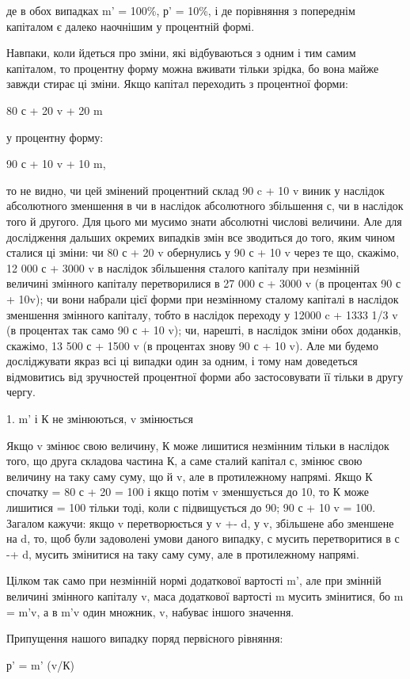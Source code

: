 де в обох випадках m' = 100\%, р' = 10\%, і де порівняння з попереднім
капіталом є далеко наочнішим у процентній формі.

Навпаки, коли йдеться про зміни, які відбуваються з одним
і тим самим капіталом, то процентну форму можна вживати
тільки зрідка, бо вона майже завжди стирає ці зміни. Якщо
капітал переходить з процентної форми:

80 с + 20 v + 20 m

у процентну форму:

90 с + 10 v + 10 m,

то не видно, чи цей змінений процентний склад 90 c + 10 v виник
у наслідок абсолютного зменшення в чи в наслідок абсолютного
збільшення с, чи в наслідок того й другого. Для цього ми мусимо
знати абсолютні числові величини. Але для дослідження
дальших окремих випадків змін все зводиться до того, яким
чином сталися ці зміни: чи 80 с + 20 v обернулись у 90 с + 10 v
через те що, скажімо, 12 000 с + 3000 v в наслідок збільшення
сталого капіталу при незмінній величині змінного капіталу перетворилися
в 27 000 с + 3000 v (в процентах 90 с + 10v); чи вони
набрали цієї форми при незмінному сталому капіталі в наслідок
зменшення змінного капіталу, тобто в наслідок переходу у
12000 c + 1333 1/3 v (в процентах так само 90 с + 10 v); чи, нарешті,
в наслідок зміни обох доданків, скажімо, 13 500 с + 1500 v
(в процентах знову 90 с + 10 v). Але ми будемо досліджувати
якраз всі ці випадки один за одним, і тому нам доведеться
відмовитись від зручностей процентної форми або застосовувати
її тільки в другу чергу.

1. m' і К не змінюються, v змінюється

Якщо v змінює свою величину, К може лишитися незмінним
тільки в наслідок того, що друга складова частина К, а саме
сталий капітал с, змінює свою величину на таку саму суму, що й v,
але в протилежному напрямі. Якщо К спочатку = 80 с + 20 = 100
і якщо потім v зменшується до 10, то К може лишитися = 100
тільки тоді, коли с підвищується до 90; 90 с + 10 v = 100. Загалом
кажучи: якщо v перетворюється у v +- d, у v, збільшене або
зменшене на d, то, щоб були задоволені умови даного випадку,
с мусить перетворитися в с -+ d, мусить змінитися на таку саму
суму, але в протилежному напрямі.

Цілком так само при незмінній нормі додаткової вартості m',
але при змінній величині змінного капіталу v, маса додаткової
вартості m мусить змінитися, бо m = m'v, а в m'v один множник,
v, набуває іншого значення.

Припущення нашого випадку поряд первісного рівняння:

р' = m' (v/К)
